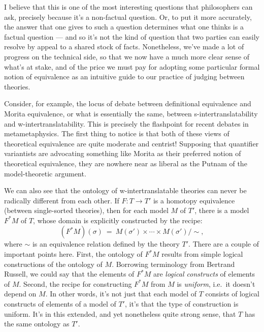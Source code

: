 I believe that this is one of the most interesting questions that
philosophers can ask, precisely because it's a non-factual question.
Or, to put it more accurately, the answer that one gives to such a
question determines what one thinks is a factual question --- and so
it's not the kind of question that two parties can easily resolve by
appeal to a shared stock of facts.  Nonetheless, we've made a lot of
progress on the technical side, so that we now have a much more clear
sense of what's at stake, and of the price we must pay for adopting
some particular formal notion of equivalence as an intuitive guide to
our practice of judging between theories.

Consider, for example, the locus of debate between definitional
equivalence and Morita equivalence, or what is essentially the same,
between s-intertranslatability and w-intertranslatability.  This is
precisely the flashpoint for recent debates in metametaphysics.  The
first thing to notice is that both of these views of theoretical
equivalence are quite moderate and centrist!  Supposing that
quantifier variantists are advocating something like Morita as their
preferred notion of theoretical equivalence, they are nowhere near as
liberal as the Putnam of the model-theoretic argument.

We can also see that the ontology of w-intertranslatable theories can
never be radically different from each other.  If $F:T\to T'$ is a
homotopy equivalence (between single-sorted theories), then for each
model $M$ of $T'$, there is a model $F^*M$ of $T$, whose domain is
explicitly constructed by the recipe:
\[ (F^*M)(\sigma ) \: = \: M(\sigma ')\times\cdots\times M(\sigma
  ')/\sim ,\] where $\sim$ is an equivalence relation defined by the
theory $T'$.  There are a couple of important points here.  First, the
ontology of $F^*M$ results from simple logical constructions of the
ontology of $M$.  Borrowing terminology from Bertrand Russell, we
could say that the elements of $F^*M$ are {\it logical constructs} of
elements of $M$.  Second, the recipe for constructing $F^*M$ from $M$
is {\it uniform}, i.e.\ it doesn't depend on $M$.  In other words,
it's not just that each model of $T$ consists of logical constructs of
elements of a model of $T'$, it's that the type of construction is
uniform.  It's in this extended, and yet nonetheless quite strong
sense, that $T$ has the same ontology as $T'$.

